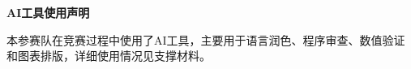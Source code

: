 {}
\begin{center}
  {\bfseries AI工具使用声明}
\end{center}

本参赛队在竞赛过程中使用了AI工具，主要用于语言润色、程序审查、数值验证和图表排版，详细使用情况见支撑材料。
